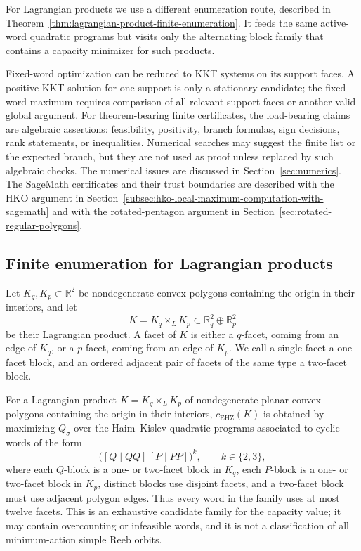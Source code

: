 For Lagrangian products we use a different enumeration route, described in
Theorem~\ref{thm:lagrangian-product-finite-enumeration}. It feeds the same
active-word quadratic programs but visits only the alternating block family that
contains a capacity minimizer for such products.

Fixed-word optimization can be reduced to KKT systems on its support faces.
A positive KKT solution for one support is only a stationary candidate; the
fixed-word maximum requires comparison of all relevant support faces or
another valid global argument.
For theorem-bearing finite certificates, the load-bearing claims are
algebraic assertions: feasibility, positivity, branch formulas, sign decisions,
rank statements, or inequalities. Numerical searches may suggest the finite
list or the expected branch, but they are not used as proof unless replaced by
such algebraic checks. The numerical issues are discussed in
Section~\ref{sec:numerics}.  The SageMath certificates and their trust boundaries are
described with the HKO argument in
Section~\ref{subsec:hko-local-maximum-computation-with-sagemath} and with the
rotated-pentagon argument in Section~\ref{sec:rotated-regular-polygons}.

\subsection{Finite enumeration for Lagrangian products}
\label{subsec:quadratic-program-algorithm-hk2019-lagrangian-products}

Let \(K_q,K_p\subset\mathbb{R}^2\) be nondegenerate convex polygons containing
the origin in their interiors, and let
\[
  K=K_q\times_L K_p\subset\mathbb{R}^2_q\oplus\mathbb{R}^2_p
\]
be their Lagrangian product. A facet of \(K\) is either a \(q\)-facet,
coming from an edge of \(K_q\), or a \(p\)-facet, coming from an edge of
\(K_p\). We call a single facet a one-facet block, and an ordered adjacent pair
of facets of the same type a two-facet block.

\begin{theorem}
\label{thm:lagrangian-product-finite-enumeration}
For a Lagrangian product \(K=K_q\times_L K_p\) of nondegenerate planar convex
polygons containing the origin in their interiors, \(c_{\mathrm{EHZ}}(K)\) is
obtained by maximizing \(Q_\sigma\) over the Haim--Kislev quadratic programs
associated to cyclic words of the form
\[
  \bigl([Q\mid QQ]\,[P\mid PP]\bigr)^k,
  \qquad k\in\{2,3\},
\]
where each \(Q\)-block is a one- or two-facet block in \(K_q\), each
\(P\)-block is a one- or two-facet block in \(K_p\), distinct blocks use
disjoint facets, and a two-facet block must use adjacent polygon edges. Thus
every word in the family uses at most twelve facets. This is an exhaustive
candidate family for the capacity value; it may contain
overcounting or infeasible words, and it is not a classification of all
minimum-action simple Reeb orbits.
\end{theorem}

